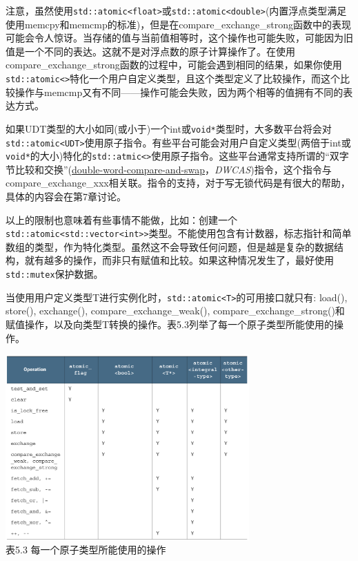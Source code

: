 注意，虽然使用\texttt{std::atomic<float>}或\texttt{std::atomic<double>}(内置浮点类型满足使用memcpy和memcmp的标准)，但是在compare\_exchange\_strong函数中的表现可能会令人惊讶。当存储的值与当前值相等时，这个操作也可能失败，可能因为旧值是一个不同的表达。这就不是对浮点数的原子计算操作了。在使用compare\_exchange\_strong函数的过程中，可能会遇到相同的结果，如果你使用\texttt{std::atomic<>}特化一个用户自定义类型，且这个类型定义了比较操作，而这个比较操作与memcmp又有不同——操作可能会失败，因为两个相等的值拥有不同的表达方式。

如果UDT类型的大小如同(或小于)一个int或\texttt{void*}类型时，大多数平台将会对\texttt{std::atomic<UDT>}使用原子指令。有些平台可能会对用户自定义类型(两倍于int或\texttt{void*}的大小)特化的\texttt{std::atmic<>}使用原子指令。这些平台通常支持所谓的“双字节比较和交换”(\href{http://en.wikipedia.org/wiki/Double_compare-and-swap}{double-word-compare-and-swap}，\textit{DWCAS})指令，这个指令与compare\_exchange\_xxx相关联。指令的支持，对于写无锁代码是有很大的帮助，具体的内容会在第7章讨论。

以上的限制也意味着有些事情不能做，比如：创建一个\texttt{std::atomic<std::vector<int>>}类型。不能使用包含有计数器，标志指针和简单数组的类型，作为特化类型。虽然这不会导致任何问题，但是越是复杂的数据结构，就有越多的操作，而非只有赋值和比较。如果这种情况发生了，最好使用\texttt{std::mutex}保护数据。

当使用用户定义类型T进行实例化时，\texttt{std::atomic<T>}的可用接口就只有: load(), store(), exchange(), compare\_exchange\_weak(), compare\_exchange\_strong()和赋值操作，以及向类型T转换的操作。表5.3列举了每一个原子类型所能使用的操作。


\begin{center}
    \includegraphics[width=0.7\textwidth]{content/chapter05/images/5-3-table.png}\\
    表5.3 每一个原子类型所能使用的操作
\end{center}

